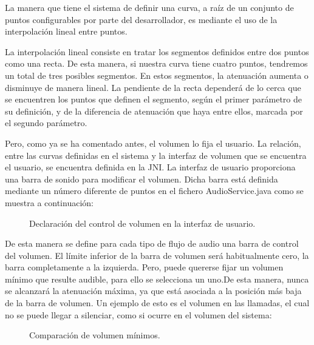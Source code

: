 La manera que tiene el sistema de definir una curva, a raíz de un conjunto de puntos configurables por parte del desarrollador, es mediante el uso de la interpolación lineal entre puntos.

La interpolación lineal consiste en tratar los segmentos definidos entre dos puntos como una recta. De esta manera, si nuestra curva tiene cuatro puntos, tendremos un total de tres posibles segmentos. En estos segmentos, la atenuación aumenta o disminuye de manera lineal. La pendiente de la recta dependerá de lo cerca que se encuentren los puntos que definen el segmento, según el primer parámetro de su definición, y de la diferencia de atenuación que haya entre ellos, marcada por el segundo parámetro.

Pero, como ya se ha comentado antes, el volumen lo fija el usuario. La relación, entre las curvas definidas en el sistema y la interfaz de volumen que se encuentra el usuario, se encuentra definida en la \gls{JNI}. La interfaz de usuario proporciona una barra de sonido para modificar el volumen. Dicha barra está definida mediante un número diferente de puntos en el fichero AudioService.java como se muestra a continuación:

\begin{figure}[H]
	\centering
	\caption{Declaración del control de volumen en la interfaz de usuario.} \label{fig:volume_curves_ui}
\end{figure}

De esta manera se define para cada tipo de flujo de audio una barra de control del volumen. El límite inferior de la barra de volumen será habitualmente cero, la barra completamente a la izquierda. Pero, puede quererse fijar un volumen mínimo que resulte audible, para ello se selecciona un uno.De esta manera, nunca se alcanzará la atenuación máxima, ya que está asociada a la posición más baja de la barra de volumen. Un ejemplo de esto es el volumen en las llamadas, el cual no se puede llegar a silenciar, como si ocurre en el volumen del sistema:

\begin{figure}[H]
	\centering
	\caption{Comparación de volumen mínimos.}
	\label{fig:vol_min}
\end{figure}

